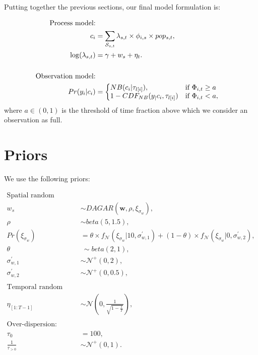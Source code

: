 \documentclass[
]{article}
\begin{document}
Putting together the previous sections, our final model formulation is:

\[
\begin{aligned}
\text{Process model:}\\
c_i &= \sum_{\mathcal{S}_{s,t}} \lambda_{s,t} \times \phi_{i,s} \times pop_{s,t},\\
\log(\lambda_{s,t}) &= \gamma + w_{s} + \eta_t.\\\\
\text{Observation model:}\\
Pr(y_i|c_i) &=   \left\{
  \begin{array}{@{}ll@{}}
    NB(c_i| \tau_{l[i]}), & \text{if}\ \Phi_{i,t} \geq a  \\
    1- CDF_{NB}(y_|c_i, \tau_{l[i]}) & \text{if}\ \Phi_{i,t} < a,
  \end{array}\right.
\end{aligned}
\]
where \(a \in (0,1)\) is the threshold of time fraction above which we consider an observation as full.

\hypertarget{priors}{%
\section{Priors}\label{priors}}

We use the following priors:

\[
\begin{aligned}
\text{Spatial random effects:}\\
w_s & \sim DAGAR(\boldsymbol{w}, \rho, \xi_{\sigma_w}),\\
\rho & \sim beta(5, 1.5),\\
Pr(\xi_{\sigma_w}) &= \theta \times f_{\mathcal{N}}(\xi_{\sigma_w} | 10, \sigma^\prime_{w,1}) + (1-\theta) \times f_{\mathcal{N}}(\xi_{\sigma_w} | 0, \sigma^\prime_{w,2}),\\
\theta &~ \sim beta(2, 1),\\
\sigma^\prime_{w,1} & \sim \mathcal{N}^+(0, 2),\\
\sigma^\prime_{w,2} & \sim \mathcal{N}^+(0, 0.5),\\\\
\text{Temporal random effects:}\\
\eta_{[1:T-1]} & \sim \mathcal{N} \left( 0, \frac{1}{\sqrt{1- \frac{1}{T}}}\right),\\\\
\text{Over-dispersion:}\\
\tau_0 &= 100,\\
\frac{1}{\tau_{>0}} & \sim \mathcal{N}^+(0,1).
\end{aligned}
\]
\end{document}
